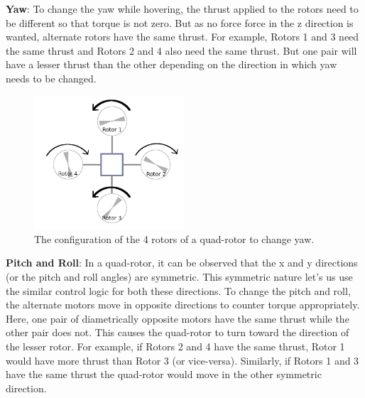 \documentclass[hidelinks,BTech]{iitmdiss}
\begin{document}
{\bf Yaw}: To change the yaw while hovering, the thrust applied to the rotors need to be different so that torque is not zero. But as no force force in the z direction is wanted, alternate rotors have the same thrust. For example, Rotors 1 and 3 need the same thrust and Rotors 2 and 4 also need the same thrust. But one pair will have a lesser thrust than the other depending on the direction in which yaw needs to be changed.

\begin{figure}[H]
  \centering
    \includegraphics[width=0.5\textwidth]{quadrotor_rotors_yaw.png}
    \caption{The configuration of the 4 rotors of a quad-rotor to change yaw.}
\end{figure}

{\bf Pitch and Roll}: In a quad-rotor, it can be observed that the x and y directions (or the pitch and roll angles) are symmetric. This symmetric nature let's us use the similar control logic for both these directions. To change the pitch and roll, the alternate motors move in opposite directions to counter torque appropriately. Here, one pair of diametrically opposite motors have the same thrust while the other pair does not. This causes the quad-rotor to turn toward the direction of the lesser rotor. For example, if Rotors 2 and 4 have the same thrust, Rotor 1 would have more thrust than Rotor 3 (or vice-versa). Similarly, if Rotors 1 and 3 have the same thrust the quad-rotor would move in the other symmetric direction.
\end{document}
